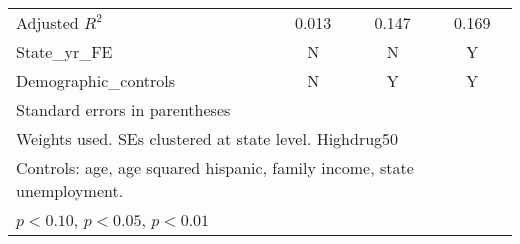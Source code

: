 \begin{table}[htbp]
\begin{tabular}{l*{3}{c}}
Adjusted \(R^{2}\)  &       0.013         &       0.147         &       0.169         \\
State\_yr\_FE         &           N         &           N         &           Y         \\
Demographic\_controls&           N         &           Y         &           Y         \\
\hline\hline
\multicolumn{4}{l}{\footnotesize Standard errors in parentheses}\\
\multicolumn{4}{l}{\footnotesize Weights used. SEs clustered at state level. Highdrug50}\\
\multicolumn{4}{l}{\footnotesize Controls: age, age squared hispanic, family income, state unemployment.}\\
\multicolumn{4}{l}{\footnotesize \sym{*} \(p<0.10\), \sym{**} \(p<0.05\), \sym{***} \(p<0.01\)}\\
\end{tabular}
\end{table}
